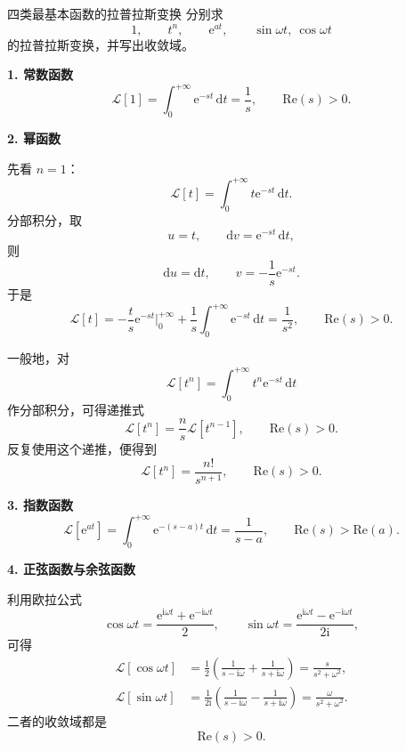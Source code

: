 \begin{lizi}{四类最基本函数的拉普拉斯变换}{}
分别求
\[
    1,\qquad t^n,\qquad \mathrm{e}^{at},\qquad \sin\omega t,\ \cos\omega t
\]
的拉普拉斯变换，并写出收敛域。

\begin{jie}
\textbf{1. 常数函数}
\[
    \mathcal{L}[1]
    =
    \int_0^{+\infty} \mathrm{e}^{-st}\,\mathrm{d}t
    =
    \frac{1}{s},
    \qquad \mathrm{Re}(s)>0.
\]

\textbf{2. 幂函数}

先看 $n=1$：
\[
    \mathcal{L}[t]
    =
    \int_0^{+\infty} t\mathrm{e}^{-st}\,\mathrm{d}t.
\]
分部积分，取
\[
    u=t,\qquad \mathrm{d}v=\mathrm{e}^{-st}\,\mathrm{d}t,
\]
则
\[
    \mathrm{d}u=\mathrm{d}t,\qquad v=-\frac{1}{s}\mathrm{e}^{-st}.
\]
于是
\[
    \mathcal{L}[t]
    =
    -\frac{t}{s}\mathrm{e}^{-st}\Big|_0^{+\infty}
    +
    \frac{1}{s}\int_0^{+\infty} \mathrm{e}^{-st}\,\mathrm{d}t
    =
    \frac{1}{s^2},
    \qquad \mathrm{Re}(s)>0.
\]

一般地，对
\[
    \mathcal{L}[t^n]
    =
    \int_0^{+\infty} t^n \mathrm{e}^{-st}\,\mathrm{d}t
\]
作分部积分，可得递推式
\[
    \mathcal{L}[t^n]
    =
    \frac{n}{s}\mathcal{L}[t^{n-1}],
    \qquad \mathrm{Re}(s)>0.
\]
反复使用这个递推，便得到
\[
    \mathcal{L}[t^n]
    =
    \frac{n!}{s^{n+1}},
    \qquad \mathrm{Re}(s)>0.
\]

\textbf{3. 指数函数}
\[
    \mathcal{L}[\mathrm{e}^{at}]
    =
    \int_0^{+\infty} \mathrm{e}^{-(s-a)t}\,\mathrm{d}t
    =
    \frac{1}{s-a},
    \qquad \mathrm{Re}(s)>\mathrm{Re}(a).
\]

\textbf{4. 正弦函数与余弦函数}

利用欧拉公式
\[
    \cos\omega t
    =
    \frac{\mathrm{e}^{\mathrm{i}\omega t}+\mathrm{e}^{-\mathrm{i}\omega t}}{2},
    \qquad
    \sin\omega t
    =
    \frac{\mathrm{e}^{\mathrm{i}\omega t}-\mathrm{e}^{-\mathrm{i}\omega t}}{2\mathrm{i}},
\]
可得
\begin{align}
    \mathcal{L}[\cos\omega t]
    &=
    \frac{1}{2}
    \left(
        \frac{1}{s-\mathrm{i}\omega}
        +
        \frac{1}{s+\mathrm{i}\omega}
    \right)
    =
    \frac{s}{s^2+\omega^2}, \\
    \mathcal{L}[\sin\omega t]
    &=
    \frac{1}{2\mathrm{i}}
    \left(
        \frac{1}{s-\mathrm{i}\omega}
        -
        \frac{1}{s+\mathrm{i}\omega}
    \right)
    =
    \frac{\omega}{s^2+\omega^2}.
\end{align}
二者的收敛域都是
\[
    \mathrm{Re}(s)>0.
\]
\end{jie}
\end{lizi}

